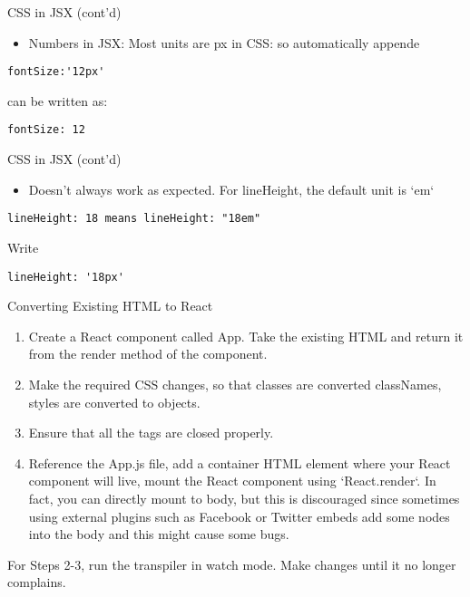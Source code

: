 \documentclass[presentation]{beamer}
\begin{document}
\begin{frame}[fragile,label=sec-12]{CSS in JSX (cont'd)}
 \begin{itemize}
\item Numbers in JSX: Most units are px in CSS: so automatically appende
\end{itemize}
\begin{verbatim}
fontSize:'12px'
\end{verbatim}
can be written as:
\begin{verbatim}
fontSize: 12
\end{verbatim}
\end{frame}

\begin{frame}[fragile,label=sec-13]{CSS in JSX (cont'd)}
 \begin{itemize}
\item Doesn't always work as expected. For lineHeight, the default unit is `em`
\end{itemize}
\begin{verbatim}
lineHeight: 18 means lineHeight: "18em"
\end{verbatim}

Write
\begin{verbatim}
lineHeight: '18px'
\end{verbatim}
\end{frame}

\begin{frame}[label=sec-14]{Converting Existing HTML to React}
\begin{enumerate}
\item Create a React component called App. Take the existing HTML  and return it from the render method of the component.

\item Make the required CSS changes, so that classes are converted classNames, styles are converted to objects.

\item Ensure that all the tags are closed properly.

\item Reference the App.js file, add a container HTML element where your React component will live, mount the React component using `React.render`. In fact, you can directly mount to body, but this is discouraged since sometimes using external plugins such as Facebook or Twitter embeds add some nodes into the body and this might cause some bugs.
\end{enumerate}

For Steps 2-3, run the transpiler in watch mode. Make changes until it no
longer complains.
\end{frame}
\end{document}
